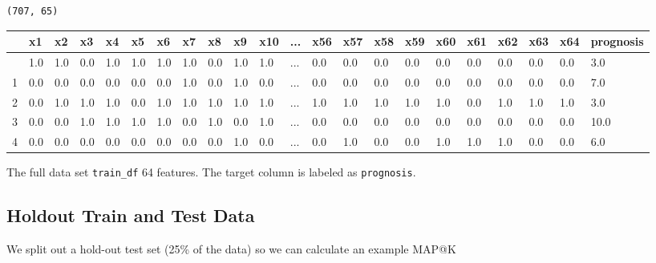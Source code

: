 \documentclass[
  letterpaper,
  DIV=11,
  numbers=noendperiod]{scrreprt}
\begin{document}
\begin{verbatim}
(707, 65)
\end{verbatim}

\begin{longtable}[]{@{}llllllllllllllllllllll@{}}
\toprule\noalign{}
& x1 & x2 & x3 & x4 & x5 & x6 & x7 & x8 & x9 & x10 & ... & x56 & x57 &
x58 & x59 & x60 & x61 & x62 & x63 & x64 & prognosis \\
\midrule\noalign{}
\endhead
\bottomrule\noalign{}
\endlastfoot
0 & 1.0 & 1.0 & 0.0 & 1.0 & 1.0 & 1.0 & 1.0 & 0.0 & 1.0 & 1.0 & ... &
0.0 & 0.0 & 0.0 & 0.0 & 0.0 & 0.0 & 0.0 & 0.0 & 0.0 & 3.0 \\
1 & 0.0 & 0.0 & 0.0 & 0.0 & 0.0 & 0.0 & 1.0 & 0.0 & 1.0 & 0.0 & ... &
0.0 & 0.0 & 0.0 & 0.0 & 0.0 & 0.0 & 0.0 & 0.0 & 0.0 & 7.0 \\
2 & 0.0 & 1.0 & 1.0 & 1.0 & 0.0 & 1.0 & 1.0 & 1.0 & 1.0 & 1.0 & ... &
1.0 & 1.0 & 1.0 & 1.0 & 1.0 & 0.0 & 1.0 & 1.0 & 1.0 & 3.0 \\
3 & 0.0 & 0.0 & 1.0 & 1.0 & 1.0 & 1.0 & 0.0 & 1.0 & 0.0 & 1.0 & ... &
0.0 & 0.0 & 0.0 & 0.0 & 0.0 & 0.0 & 0.0 & 0.0 & 0.0 & 10.0 \\
4 & 0.0 & 0.0 & 0.0 & 0.0 & 0.0 & 0.0 & 0.0 & 0.0 & 1.0 & 0.0 & ... &
0.0 & 1.0 & 0.0 & 0.0 & 1.0 & 1.0 & 1.0 & 0.0 & 0.0 & 6.0 \\
\end{longtable}

The full data set \texttt{train\_df} 64 features. The target column is
labeled as \texttt{prognosis}.

\hypertarget{holdout-train-and-test-data-3}{%
\subsection{Holdout Train and Test
Data}\label{holdout-train-and-test-data-3}}

We split out a hold-out test set (25\% of the data) so we can calculate
an example MAP@K
\end{document}
